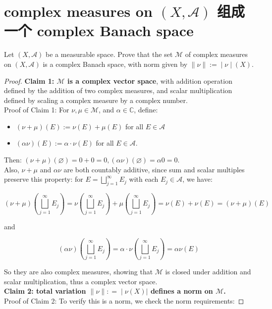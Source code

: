 \section{\texorpdfstring{complex measures on \((X,\mathcal{A})\) 组成一个 complex Banach space}{complex measures on (X,\textbackslash mathcal\{A\}) 组成一个 complex Banach space}}\label{complex-measures-on-xmathcala-ux7ec4ux6210ux4e00ux4e2a-complex-banach-space}

Let \((X,\mathcal{A})\) be a measurable space. Prove that the set \(\mathcal{M}\) of complex measures on \((X,\mathcal{A})\) is a complex Banach space, with norm given by \(\left. \parallel \nu \parallel := \middle| \nu \middle| (X) \right.\).

\begin{proof}

\textbf{Claim 1: \(\mathcal{M}\) is a complex vector space}, with addition operation defined by the addition of two complex measures, and scalar multiplication defined by scaling a complex measure by a complex number.\\
Proof of Claim 1: For \(\nu,\mu \in \mathcal{M}\), and \(\alpha \in \mathbb{C}\), define:

\begin{itemize}
\item
  \((\nu + \mu)(E) := \nu(E) + \mu(E)\) for all \(E \in \mathcal{A}\)
\item
  \((\alpha\nu)(E) := \alpha \cdot \nu(E)\) for all \(E \in \mathcal{A}\).
\end{itemize}

Then: \((\nu + \mu)(\varnothing) = 0 + 0 = 0,(\alpha\nu)(\varnothing) = \alpha 0 = 0\).\\
Also, \(\nu + \mu\) and \(\alpha\nu\) are both countably additive, since sum and scalar multiples preserve this property: for \(E = \bigsqcup_{j = 1}^{\infty}E_{j}\) with each \(E_{j} \in \mathcal{A}\), we have:

\[(\nu + \mu)(\bigsqcup\limits_{j = 1}^{\infty}E_{j}) = \nu(\bigsqcup\limits_{j = 1}^{\infty}E_{j}) + \mu(\bigsqcup\limits_{j = 1}^{\infty}E_{j}) = \nu(E) + \nu(E) = (\nu + \mu)(E)\]

and

\[(\alpha\nu)(\bigsqcup\limits_{j = 1}^{\infty}E_{j}) = \alpha \cdot \nu(\bigsqcup\limits_{j = 1}^{\infty}E_{j}) = \alpha\nu(E)\]

So they are also complex measures, showing that \(\mathcal{M}\) is closed under addition and scalar multiplication, thus a complex vector space.\\
\textbf{Claim 2: total variation \(\left. \parallel \nu \parallel : = \middle| \nu(X)| \right.\) defines a norm on \(\mathcal{M}\).}\\
Proof of Claim 2: To verify this is a norm, we check the norm requirements:


\end{proof}
